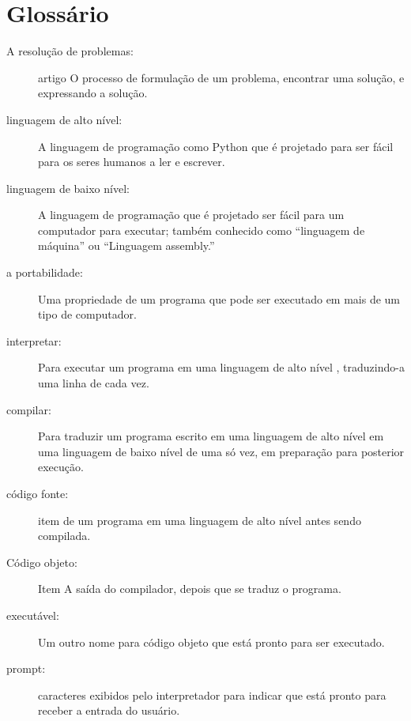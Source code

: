 \documentclass[10pt]{book}
\begin{document}
\section{Glossário}

\begin{description}

\item[A resolução de problemas:] artigo O processo de formulação de um problema, encontrar
uma solução, e expressando a solução.

\item[linguagem de alto nível:] A linguagem de programação como Python que
é projetado para ser fácil para os seres humanos a ler e escrever.

\item[linguagem de baixo nível:] A linguagem de programação que é projetado
ser fácil para um computador para executar; também conhecido como ``linguagem de máquina'' ou
``Linguagem assembly.''

\item[a portabilidade:] Uma propriedade de um programa que pode ser executado em mais
de um tipo de computador.

\item[interpretar:] Para executar um programa em uma linguagem de alto nível
, traduzindo-a uma linha de cada vez.

\item[compilar:] Para traduzir um programa escrito em uma linguagem de alto nível
em uma linguagem de baixo nível de uma só vez, em preparação para posterior
execução.

\item[código fonte:] item de um programa em uma linguagem de alto nível antes
sendo compilada.

\item[Código objeto:] Item A saída do compilador, depois que se traduz
o programa.

\item[executável:] Um outro nome para código objeto que está pronto
para ser executado.

\item[prompt:] caracteres exibidos pelo interpretador para indicar
que está pronto para receber a entrada do usuário.


\end{description}
\end{document}
